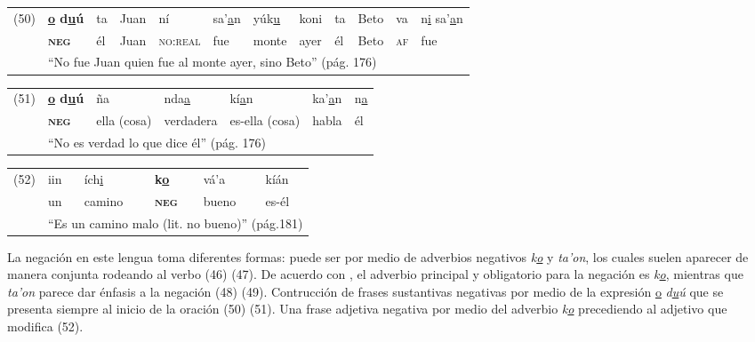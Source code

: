 {%
{\small
\noindent \begin{tabular}{llllllllllll}
 (50) & \textbf{\underline{o} d\underline{u}ú} & ta & Juan & ní & sa'\underline{a}n & yúk\underline{u} & koni & ta & Beto & va & n\underline{i} sa'\underline{a}n \\
 & \textsc{\textbf{neg}} & él & Juan & \textsc{no:real} & fue & monte & ayer & él & Beto & \textsc{af} & fue \\
 & \multicolumn{11}{l}{``No fue Juan quien fue al monte ayer, sino Beto'' (pág. 176)}
\end{tabular} \vspace{0.2cm}
}

\noindent \begin{tabular}{lllllll}
(51) & \textbf{\underline{o} d\underline{u}ú} & ña & nda\underline{a} & kí\underline{a}n & ka'\underline{a}n & n\underline{a} \\
& \textsc{\textbf{neg}} & ella (cosa) & verdadera & es-ella (cosa) & habla & él \\
& \multicolumn{6}{l}{``No es verdad lo que dice él'' (pág. 176)}
\end{tabular} \vspace{0.2cm}

\noindent \begin{tabular}{llllll}
(52) & iin & ích\underline{i} & \textbf{k\underline{o}} & vá'a & kíán \\
& un & camino & \textsc{\textbf{neg}} & bueno & es-él \\
& \multicolumn{5}{l}{``Es un camino malo (lit. no bueno)'' (pág.181)}
\end{tabular} \vspace{0.25cm}

}

La negación en este lengua toma diferentes formas: puede ser por medio de adverbios negativos {\setmainfont{Charis SIL} \textit{k\underline{o}} y \textit{ta'on}}, los cuales suelen aparecer de manera conjunta rodeando al verbo (46) (47). De acuerdo con \textcolor{MidnightBlue}{\citet{Mixteco}}, el adverbio principal y obligatorio para la negación es {\setmainfont{Charis SIL} \textit{k\underline{o}}}, mientras que {\setmainfont{Charis SIL} \textit{ta'on}} parece dar énfasis a la negación (48) (49). Contrucción de frases sustantivas negativas por medio de la expresión {\setmainfont{Charis SIL} \underline{o} \textit{d\underline{u}ú}} que se presenta siempre al inicio de la oración (50) (51). Una frase adjetiva negativa por medio del adverbio {\setmainfont{Charis SIL} \textit{k\underline{o}}} precediendo al adjetivo que modifica (52).